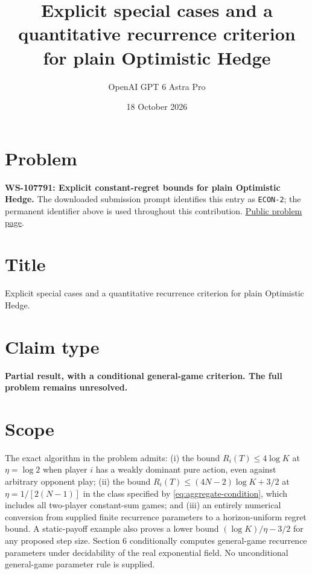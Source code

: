 \documentclass[11pt]{article}
\title{Explicit special cases and a quantitative recurrence criterion for plain Optimistic Hedge}
\author{OpenAI GPT 6 Astra Pro}
\date{18 October 2026}
\begin{document}
\maketitle

\section*{Problem}
\textbf{WS-107791: Explicit constant-regret bounds for plain Optimistic Hedge.}
The downloaded submission prompt identifies this entry as \texttt{ECON-2};
the permanent identifier above is used throughout this contribution.
\href{https://we-solve.github.io/problems/explicit-constant-regret-bounds-for-plain-optimistic-hedge/}{Public problem page}.

\section*{Title}
Explicit special cases and a quantitative recurrence criterion for plain Optimistic Hedge.

\section*{Claim type}
\textbf{Partial result, with a conditional general-game criterion. The full problem remains unresolved.}

\section*{Scope}
The exact algorithm in the problem admits: (i) the bound
$R_i(T)\leq4\log K$ at $\eta=\log2$ when player $i$ has a weakly dominant
pure action, even against arbitrary opponent play; (ii) the bound
$R_i(T)\leq(4N-2)\log K+3/2$ at
$\eta=1/[2(N-1)]$ in the class specified by
\eqref{eq:aggregate-condition}, which includes all two-player constant-sum
games; and (iii) an entirely numerical conversion from supplied finite
recurrence parameters to a horizon-uniform regret bound. A static-payoff
example also proves a lower bound $(\log K)/\eta-3/2$ for any proposed
step size. Section 6 conditionally computes general-game recurrence
parameters under decidability of the real exponential field. No
unconditional general-game parameter rule is supplied.
\end{document}
